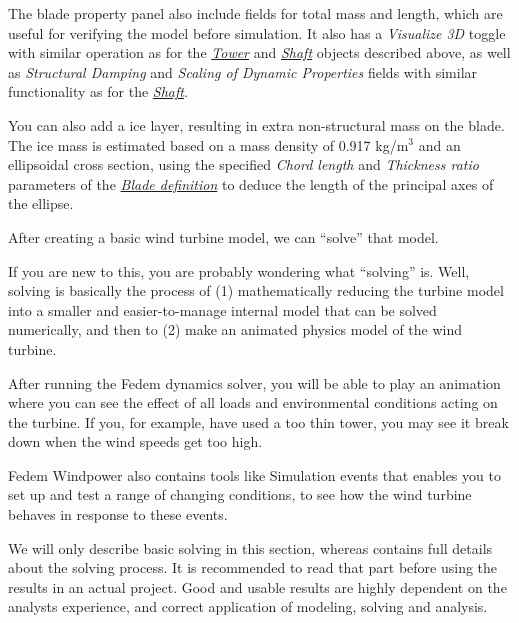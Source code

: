The blade property panel also include fields for total mass and length,
which are useful for verifying the model before simulation.
It also has a {\sl Visualize 3D} toggle with similar operation as for the
\protect\hyperlink{tower}{\sl Tower} and \protect\hyperlink{shaft}{\sl Shaft}
objects described above, as well as {\sl Structural Damping} and
{\sl Scaling of Dynamic Properties} fields with similar functionality
as for the \protect\hyperlink{shaft}{\sl Shaft}.

You can also add a ice layer, resulting in extra non-structural mass on
the blade. The ice mass is estimated based on a mass density of 0.917 kg/m$^3$
and an ellipsoidal cross section, using the specified {\sl Chord length}
and {\sl Thickness ratio} parameters of the
\protect\hyperlink{blade-definition}{\sl Blade definition} to deduce the
length of the principal axes of the ellipse.

\clearpage



After creating a basic wind turbine model, we can ``solve'' that model.

If you are new to this, you are probably wondering what ``solving'' is.
Well, solving is basically the process of (1) mathematically reducing
the turbine model into a smaller and easier-to-manage internal model that can
be solved numerically, and then to (2) make an animated physics model
of the wind turbine.

After running the Fedem dynamics solver, you will be able to play an animation
where you can see the effect of all loads and environmental conditions acting
on the turbine. If you, for example, have used a too thin tower,
you may see it break down when the wind speeds get too high.

Fedem Windpower also contains tools like Simulation events that enables
you to set up and test a range of changing conditions,
to see how the wind turbine behaves in response to these events.

We will only describe basic solving in this section,
whereas 
contains full details about the solving process. It is recommended to
read that part before using the results in an actual project.
Good and usable results are highly dependent on the analysts experience,
and correct application of modeling, solving and analysis.

